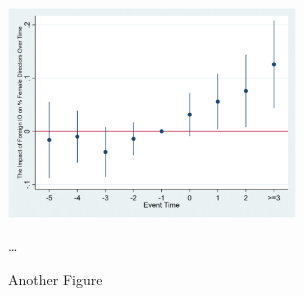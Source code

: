 \begin{figure}[H]
    \begin{center}
    \caption{Another Figure}
    \includegraphics[width=3.0in]{fig/Diagnostic-Test-of-the-Parallel-Trends-Assumption-This-figure-plots-the-coefficients-on.png}
    \end{center}
	\label{fig:mainsummary}
    \vspace{0.2cm}
    \begin{minipage}{0.95\textwidth} 
	{\footnotesize  \ldots
	\par
	}
	\end{minipage}
\end{figure}
